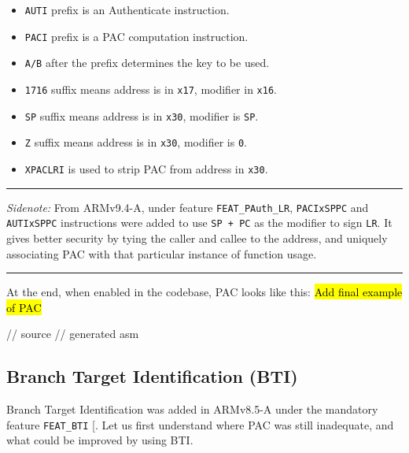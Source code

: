 \documentclass[a4paper, nobind]{templates/ociamthesis}
\providecommand{\tightlist}{%
  \setlength{\itemsep}{0pt}\setlength{\parskip}{0pt}}
\newenvironment{Shaded}{\begin{snugshade}}{\end{snugshade}}
\newcommand{\NormalTok}[1]{#1}
\renewenvironment{Shaded}
{
  \vspace{10pt}%
  \begin{snugshade}%
}{%
  \end{snugshade}%
  \vspace{8pt}%
}
\begin{document}
\begin{itemize}
\tightlist
\item
  \texttt{AUTI} prefix is an Authenticate instruction.
\item
  \texttt{PACI} prefix is a PAC computation instruction.
\item
  \texttt{A/B} after the prefix determines the key to be used.
\item
  \texttt{1716} suffix means address is in \texttt{x17}, modifier in \texttt{x16}.
\item
  \texttt{SP} suffix means address is in \texttt{x30}, modifier is \texttt{SP}.
\item
  \texttt{Z} suffix means address is in \texttt{x30}, modifier is \texttt{0}.
\item
  \texttt{XPACLRI} is used to strip PAC from address in \texttt{x30}.
\end{itemize}

\begin{center}\rule{0.5\linewidth}{0.5pt}\end{center}

\emph{Sidenote:}
From ARMv9.4-A, under feature \texttt{FEAT\_PAuth\_LR}, \texttt{PACIxSPPC} and \texttt{AUTIxSPPC}
instructions were added to use \texttt{SP\ +\ PC} as the modifier to sign \texttt{LR}.
It gives better security by tying the caller and callee to the address,
and uniquely associating PAC with that particular instance of function usage.

\begin{center}\rule{0.5\linewidth}{0.5pt}\end{center}

At the end, when enabled in the codebase, PAC looks like this:
\hl{Add final example of PAC}

\begin{Shaded}
\begin{Highlighting}[]
\NormalTok{// source}
\NormalTok{// generated asm}
\end{Highlighting}
\end{Shaded}

\subsection{Branch Target Identification (BTI)}\label{bti-bg}

Branch Target Identification was added in ARMv8.5-A under the mandatory feature \texttt{FEAT\_BTI} {[}\citeproc{ref-arm-feat-names}{13}{]}.
Let us first understand where PAC was still inadequate, and what could be improved by using BTI.
\end{document}
